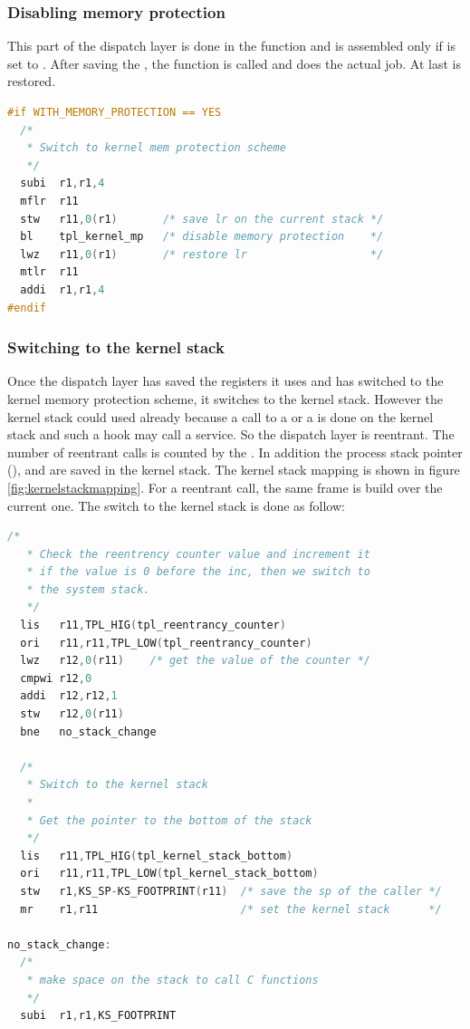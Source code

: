\subsubsection{Disabling memory protection}

This part of the dispatch layer is done in the  function and is assembled only if  is set to \YES. After saving the , the  function is called and does the actual job. At last  is restored.

\begin{lstlisting}[language=C]
#if WITH_MEMORY_PROTECTION == YES
  /*
   * Switch to kernel mem protection scheme
   */
  subi  r1,r1,4
  mflr  r11
  stw   r11,0(r1)       /* save lr on the current stack */
  bl    tpl_kernel_mp   /* disable memory protection    */
  lwz   r11,0(r1)       /* restore lr                   */
  mtlr  r11
  addi  r1,r1,4
#endif
\end{lstlisting}

\subsubsection{Switching to the kernel stack}

Once the dispatch layer has saved the registers it uses and has switched to the kernel memory protection scheme, it switches to the kernel stack. However the kernel stack could used already because a call to a  or a  is done on the kernel stack and such a hook may call a service. So the dispatch layer is reentrant. The number of reentrant calls is counted by the . In addition the process stack pointer (),  and  are saved in the kernel stack. The kernel stack mapping is shown in figure \ref{fig:kernelstackmapping}. For a reentrant call, the same frame is build over the current one. The switch to the kernel stack is done as follow:

\begin{lstlisting}[language=C]
  /*
   * Check the reentrency counter value and increment it
   * if the value is 0 before the inc, then we switch to
   * the system stack.
   */
  lis   r11,TPL_HIG(tpl_reentrancy_counter)
  ori   r11,r11,TPL_LOW(tpl_reentrancy_counter)
  lwz   r12,0(r11)    /* get the value of the counter */
  cmpwi r12,0
  addi  r12,r12,1
  stw   r12,0(r11)
  bne   no_stack_change
  
  /*
   * Switch to the kernel stack
   *
   * Get the pointer to the bottom of the stack
   */  
  lis   r11,TPL_HIG(tpl_kernel_stack_bottom)
  ori   r11,r11,TPL_LOW(tpl_kernel_stack_bottom)
  stw   r1,KS_SP-KS_FOOTPRINT(r11)  /* save the sp of the caller */
  mr    r1,r11                      /* set the kernel stack      */
  
no_stack_change:
  /*
   * make space on the stack to call C functions
   */
  subi  r1,r1,KS_FOOTPRINT
\end{lstlisting}

